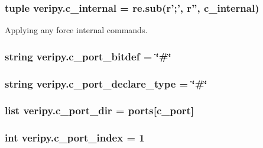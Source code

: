 \hypertarget{namespaceveripy_ad5d479254f68163a413f993072a21670}{
\subsubsection[{c\-\_\-internal}]{\setlength{\rightskip}{0pt plus 5cm}tuple veripy.\-c\-\_\-internal = re.\-sub(r';', r'', c\-\_\-internal)}}\label{namespaceveripy_ad5d479254f68163a413f993072a21670}


Applying any force internal commands. 

\hypertarget{namespaceveripy_a9505272117cc42bae0838d650df825ed}{
\subsubsection[{c\-\_\-port\-\_\-bitdef}]{\setlength{\rightskip}{0pt plus 5cm}string veripy.\-c\-\_\-port\-\_\-bitdef = \char`\"{}\#\char`\"{}}}\label{namespaceveripy_a9505272117cc42bae0838d650df825ed}
\hypertarget{namespaceveripy_a80b7caf2bd3933ac6f3120703f632f77}{
\subsubsection[{c\-\_\-port\-\_\-declare\-\_\-type}]{\setlength{\rightskip}{0pt plus 5cm}string veripy.\-c\-\_\-port\-\_\-declare\-\_\-type = \char`\"{}\#\char`\"{}}}\label{namespaceveripy_a80b7caf2bd3933ac6f3120703f632f77}
\hypertarget{namespaceveripy_aa17b83309ed85682ee4b3d4da58a9bfc}{
\subsubsection[{c\-\_\-port\-\_\-dir}]{\setlength{\rightskip}{0pt plus 5cm}list veripy.\-c\-\_\-port\-\_\-dir = {\bf ports}\mbox{[}c\-\_\-port\mbox{]}}}\label{namespaceveripy_aa17b83309ed85682ee4b3d4da58a9bfc}
\hypertarget{namespaceveripy_ac0090bfe22807ee67cf30a98d6996df7}{
\subsubsection[{c\-\_\-port\-\_\-index}]{\setlength{\rightskip}{0pt plus 5cm}int veripy.\-c\-\_\-port\-\_\-index = 1}}\label{namespaceveripy_ac0090bfe22807ee67cf30a98d6996df7}
